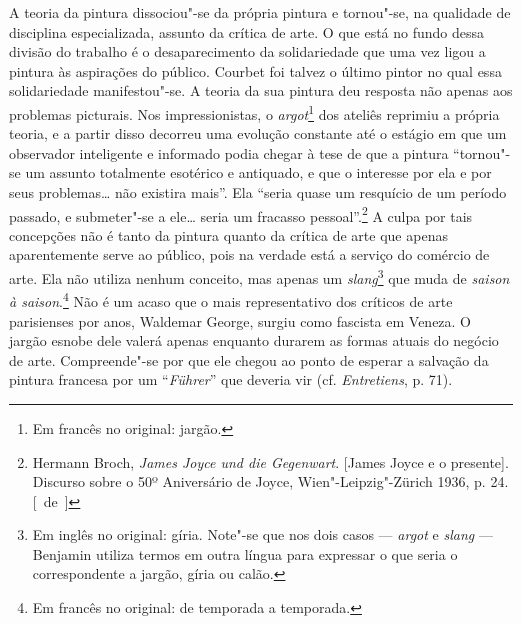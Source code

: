A teoria da pintura dissociou"-se da própria pintura e tornou"-se, na
qualidade de disciplina especializada, assunto da crítica de arte. O que
está no fundo dessa divisão do trabalho é o desaparecimento da
solidariedade que uma vez ligou a pintura às aspirações do público.
Courbet foi talvez o último pintor no qual essa solidariedade
manifestou"-se. A teoria da sua pintura deu resposta não apenas aos
problemas picturais. Nos impressionistas, o \emph{argot}\footnote{Em francês no original: jargão. \versal{[N.~T.]}} dos ateliês reprimiu a própria teoria,
e a partir disso decorreu uma evolução constante até o
estágio em que um observador inteligente e informado podia chegar à tese
de que a pintura ``tornou"-se um assunto totalmente esotérico e
antiquado, e que o interesse por ela e por seus problemas\ldots{} não
existira mais''. Ela ``seria quase um resquício de um período passado, e
submeter"-se a ele\ldots{} seria um fracasso pessoal''.\footnote{Hermann Broch, \emph{James
  Joyce und die Gegenwart}. {[}James Joyce e o presente{]}. Discurso
  sobre o 50º Aniversário de Joyce, Wien"-Leipzig"-Zürich 1936, p. 24. [~de~]} A
culpa por tais concepções não é tanto da pintura quanto da crítica de
arte que apenas aparentemente serve ao público, pois na verdade está a
serviço do comércio de arte. Ela não utiliza nenhum conceito, mas apenas
um \emph{slang}\footnote{Em inglês no original: gíria. Note"-se que
  nos dois casos --- \emph{argot} e \emph{slang} --- Benjamin utiliza termos em
  outra língua para expressar o que seria o correspondente a jargão,
  gíria ou calão. \versal{[N.~T.]}} que muda de \emph{saison à saison}.\footnote{Em francês no original: de temporada a temporada. \versal{[N.~T.]}} Não é um acaso que
o mais representativo dos críticos de arte parisienses por anos,
Waldemar George, surgiu como fascista em Veneza. O jargão esnobe dele
valerá apenas enquanto durarem as formas atuais do negócio de arte.
Compreende"-se por que ele chegou ao ponto de esperar a salvação da
pintura francesa por um ``\emph{Führer}'' que deveria vir (cf.
\emph{Entretiens}, p. 71).

